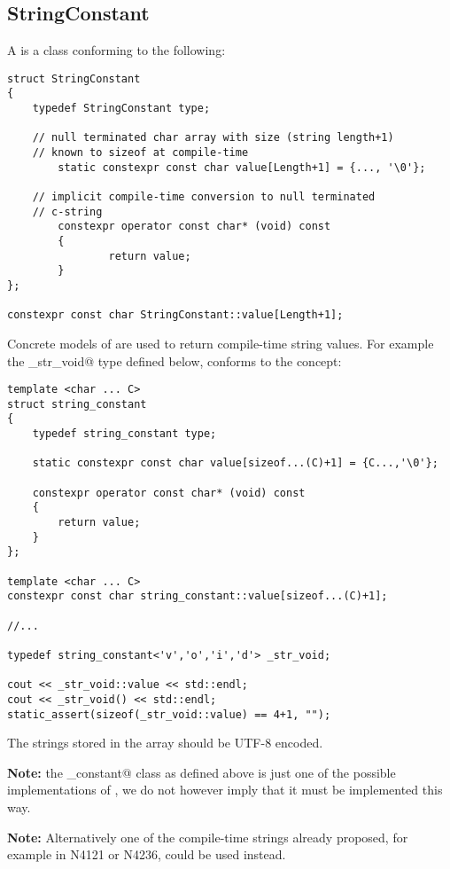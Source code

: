 \subsection{StringConstant}
\label{concept-StringConstant}

A  is a class conforming to the following:

\begin{verbatim}
struct StringConstant
{
	typedef StringConstant type;

	// null terminated char array with size (string length+1)
	// known to sizeof at compile-time
        static constexpr const char value[Length+1] = {..., '\0'};

	// implicit compile-time conversion to null terminated
	// c-string
        constexpr operator const char* (void) const
        {
                return value;
        }
};

constexpr const char StringConstant::value[Length+1];
\end{verbatim}

Concrete models of  are used to return compile-time string values.
For example the \verb@_str_void@ type defined below, conforms to the 
concept:

\begin{verbatim}
template <char ... C>
struct string_constant
{
	typedef string_constant type;

	static constexpr const char value[sizeof...(C)+1] = {C...,'\0'};

	constexpr operator const char* (void) const
	{
		return value;
	}
};

template <char ... C>
constexpr const char string_constant::value[sizeof...(C)+1];

//...

typedef string_constant<'v','o','i','d'> _str_void;

cout << _str_void::value << std::endl;
cout << _str_void() << std::endl;
static_assert(sizeof(_str_void::value) == 4+1, "");
\end{verbatim}

The strings stored in the \verb@value@ array should be UTF-8 encoded.

\textbf{Note:} the \verb@string_constant@ class as defined above is just one of the
possible implementations of , we do not however imply
that it must be implemented this way.

\textbf{Note:} Alternatively one of the compile-time strings already
proposed, for example in N4121 or N4236, could be used instead.
